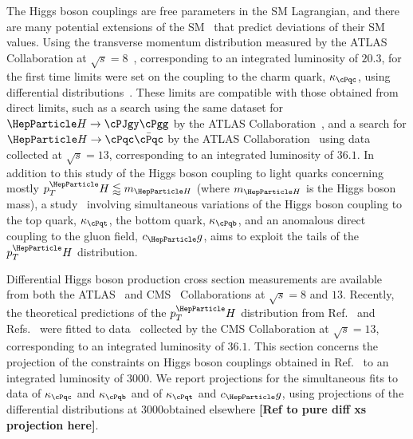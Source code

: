 \documentclass[../report.tex]{subfiles}
\newcommand{\pt}{\ensuremath{p_T}\xspace}
\newcommand{\hboson}{\ensuremath{\PH}\xspace}
\newcommand{\bquark}{\ensuremath{\cPqb}\xspace}
\newcommand{\cquark}{\ensuremath{\cPqc}\xspace}
\newcommand{\tquark}{\ensuremath{\cPqt}\xspace}
\newcommand{\photon}{\ensuremath{\cPgg}\xspace}
\newcommand{\jpsi}{\ensuremath{\cPJgy}\xspace}
\newcommand{\cc}{\ensuremath{\cquark\bar{\cquark}}\xspace}
\newcommand{\hcc}{\ensuremath{\hboson\to\cc}\xspace}
\newcommand{\pth}{\ensuremath{\pt^\hboson}\xspace}
\newcommand{\mH}{\ensuremath{m_{\hboson}}\xspace}
\newcommand{\cg}{\ensuremath{c_\Pg}\xspace}
\newcommand{\kappab}{\ensuremath{\kappa_{\bquark}}\xspace}
\newcommand{\kappac}{\ensuremath{\kappa_{\cquark}}\xspace}
\newcommand{\kappat}{\ensuremath{\kappa_{\tquark}}\xspace}
\begin{document}
The Higgs boson couplings are free parameters in the SM Lagrangian, and there are many potential extensions of the SM~\cite{Dimopoulos:1981zb,Witten:1981nf} that predict deviations of their SM values.
% 
Using the transverse momentum distribution measured by the ATLAS Collaboration at $\sqrt{s}=8$\UTeV~\cite{Aad:2015lha}, corresponding to an integrated luminosity of $20.3$\fbinv, for the first time limits were set on the coupling to the charm quark, $\kappac$, using differential distributions~\cite{Bishara:2016jga}.
% 
These limits are compatible with those obtained from direct limits, such as a search using the same dataset for $\PH\to\jpsi\photon$ by the ATLAS Collaboration~\cite{Aad:2015sda}, and a search for $\hcc$ by the ATLAS Collaboration~\cite{Aaboud:2018fhh} using data collected at $\sqrt{s}=13$\UTeV, corresponding to an integrated luminosity of $36.1$\fbinv.
% 
In addition to this study of the Higgs boson coupling to light quarks concerning mostly $\pth \lessapprox \mH$ (where $\mH$ is the Higgs boson mass), a study~\cite{Grazzini:2017szg,Grazzini:2016paz} involving simultaneous variations of the Higgs boson coupling to the top quark, $\kappat$, the bottom quark, $\kappab$, and an anomalous direct coupling to the gluon field, $\cg$, aims to exploit the tails of the $\pth$ distribution.



Differential Higgs boson production cross section measurements are available from both the ATLAS~\cite{%
Aad:2014lwa,%
Aad:2014tca,%
Aad:2016lvc,%
Aaboud:2018xdt,%
Aaboud:2017oem,%
Aaboud:2018ezd%
} and CMS~\cite{%
Khachatryan:2015rxa,%
Khachatryan:2015yvw,%
Khachatryan:2016vnn,%
Sirunyan:2018kta,%
CMS_AN_2016-442,%
CMS-PAS-HIG-17-028%
} Collaborations at $\sqrt{s}=8$ and $13$\UTeV.
% 
Recently, the  theoretical predictions of the $\pth$ distribution from Ref.~\cite{Bishara:2016jga} and Refs.~\cite{Grazzini:2017szg,Grazzini:2016paz} were fitted to data~\cite{CMS-PAS-HIG-17-028} collected by the CMS Collaboration at $\sqrt{s}=13$\UTeV, corresponding to an integrated luminosity of $36.1$\fbinv.
% 
This section concerns the projection of the constraints on Higgs boson couplings obtained in Ref.~\cite{CMS-PAS-HIG-17-028} to an integrated luminosity of $3000$\fbinv.
% 
We report projections for the simultaneous fits to data of $\kappac$ and $\kappab$ and of $\kappat$ and $\cg$, using projections of the differential distributions at $3000$\fbinv obtained elsewhere \textbf{[Ref to pure diff xs projection here]}.
\end{document}
